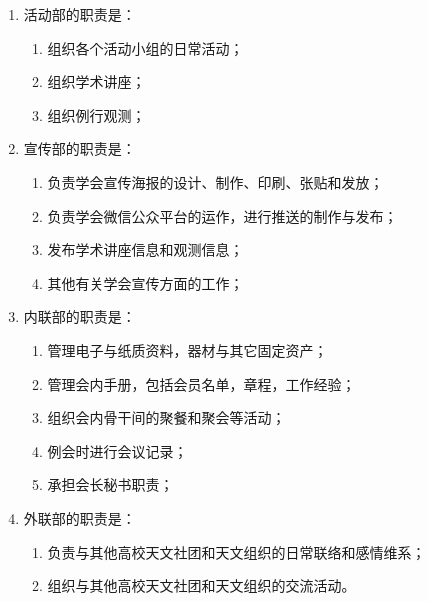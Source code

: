 \begin{enumerate}
\begin{enumerate}
        \item 活动部的职责是：
        
        \begin{enumerate}
            \item 组织各个活动小组的日常活动；
            \item 组织学术讲座；
            \item 组织例行观测；
        \end{enumerate}

        \item 宣传部的职责是：
        
        \begin{enumerate}
            \item 负责学会宣传海报的设计、制作、印刷、张贴和发放；
            \item 负责学会微信公众平台的运作，进行推送的制作与发布；
            \item 发布学术讲座信息和观测信息；
            \item 其他有关学会宣传方面的工作；
        \end{enumerate}

        \item 内联部的职责是：
        
        \begin{enumerate}
            \item 管理电子与纸质资料，器材与其它固定资产；
            \item 管理会内手册，包括会员名单，章程，工作经验；
            \item 组织会内骨干间的聚餐和聚会等活动；
            \item 例会时进行会议记录；
            \item 承担会长秘书职责；
        \end{enumerate}

        \item 外联部的职责是：
        
        \begin{enumerate}
            \item 负责与其他高校天文社团和天文组织的日常联络和感情维系；
            \item 组织与其他高校天文社团和天文组织的交流活动。
        \end{enumerate}

    \end{enumerate}
    
\end{enumerate}
